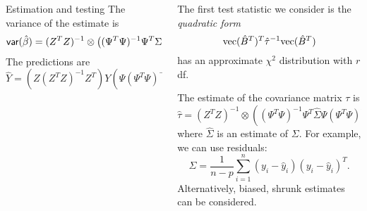 \documentclass[final,plain]{beamer}
\newcommand{\vect}{\hbox{vec}}
\newcommand{\V}{\hbox{\sffamily var}}
\newlength{\onecolwid}
\begin{document}
\begin{frame}[t]
\begin{columns}[t]
\begin{column}{\onecolwid}
\begin{block}{Estimation and testing}
    The variance of the estimate is
    \begin{equation*}
      \label{eq:tau}
      \V(\hat{\beta}) = (Z^T Z)^{-1} \otimes 
      \left( (\Psi^T \Psi)^{-1} \Psi^T \Sigma 
      \Psi (\Psi^T \Psi)^{-1} \right) \equiv \tau.
    \end{equation*}
    The predictions are
    \begin{equation}
      \hat{Y}= \left( Z \left(Z^T Z\right)^{-1} Z^T \right) Y \left(
      \Psi \left(\Psi^T \Psi\right)^{-1} \Psi^T \right).
    \end{equation}
    

  \end{block}
    \end{column}
    
\begin{column}{\onecolwid}
\begin{block}{}
    The first test statistic we consider is the {\em quadratic form}
    \begin{equation}
      \vect(\hat{B}^T)^T \hat{\tau}^{-1}  \vect(\hat{B}^T)\label{eq:stat}
    \end{equation}
    has an approximate $\chi^2$ distribution with $r$ df.

    The estimate of the covariance matrix $\tau$ is $$\hat{\tau} =
    (Z^T Z)^{-1} \otimes \left( (\Psi^T \Psi)^{-1} \Psi^T \hat{\Sigma}
    \Psi (\Psi^T \Psi)^{-1} \right),$$ where $\hat{\Sigma}$ is an
    estimate of $\Sigma$.  For example, we can use residuals:
    \begin{equation*}
      \hat{\Sigma} = \frac{1}{n-p}\sum_{i=1}^n
      (y_i-\hat{y}_i)(y_i-\hat{y}_i)^T .
    \end{equation*}
    Alternatively, biased, shrunk estimates can be considered.


\end{block}
\end{column}
\end{columns}
\end{frame}
\end{document}
